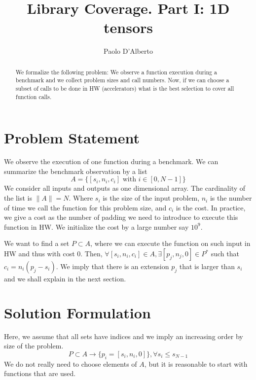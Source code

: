 \documentclass{IEEEtran}
\begin{document}
\title{Library Coverage. Part I: 1D tensors}


\author{Paolo D'Alberto}


\maketitle


\begin{abstract}
We formalize the following problem: We observe a function execution
during a benchmark and we collect problem sizes and call numbers. Now,
if we can choose a subset of calls to be done in HW (accelerators)
what is the best selection to cover all function calls. 
\end{abstract}




\section{Problem Statement}
\label{sec:introduction}

We observe the execution of one function during a benchmark. We can
summarize the benchmark observation by a list
\begin{equation}
  A = \{ [s_i, n_i, c_i] \mbox{ with } i \in [0,N-1] \}
\end{equation}
We consider all inputs and outputs as one dimensional array. The
cardinality of the list is $\|A\| = N$. Where $s_i$ is the size of the
input problem, $n_i$ is the number of time we call the function for
this problem size, and $c_i$ is the cost. In practice, we give a cost
as the number of padding we need to introduce to execute this function
in HW. We initialize the cost by a large number say $10^9$.

We want to find a set $P\subset A$, where we can execute the function
on such input in HW and thus with cost 0. Then, $\forall [s_i,
  n_i,c_i] \in A, \exists [p_j,n_j,0] \in P^* $ such that $c_i =
n_i(p_j -s_i)$.  We imply that there is an extension $p_j$ that is
larger than $s_i$ and we shall explain in the next section.

  

\section{Solution Formulation}
Here, we assume that all sets have indices and we imply an increasing
order by size of the problem.
\begin{equation}
  P \subset A \rightarrow \{ p_i = [ s_i,n_i,0 ]\}, \forall s_i \leq s_{N-1}
\end{equation}
We do not really need to choose elements of $A$, but it is reasonable
to start with functions that are used.
\end{document}
